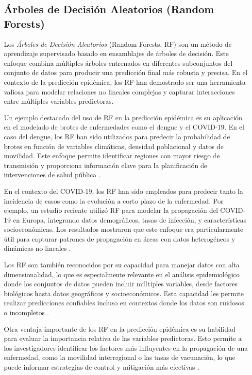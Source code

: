 \subsection{Árboles de Decisión Aleatorios (Random Forests)}\label{section:random-forests}

Los \textit{Árboles de Decisión Aleatorios} (Random Forests, RF) son un método de aprendizaje supervisado basado en ensamblajes de árboles de decisión. Este enfoque combina múltiples árboles entrenados en diferentes subconjuntos del conjunto de datos para producir una predicción final más robusta y precisa. En el contexto de la predicción epidémica, los RF han demostrado ser una herramienta valiosa para modelar relaciones no lineales complejas y capturar interacciones entre múltiples variables predictoras.

Un ejemplo destacado del uso de RF en la predicción epidémica es su aplicación en el modelado de brotes de enfermedades como el dengue y el COVID-19. En el caso del dengue, los RF han sido utilizados para predecir la probabilidad de brotes en función de variables climáticas, densidad poblacional y datos de movilidad. Este enfoque permite identificar regiones con mayor riesgo de transmisión y proporciona información clave para la planificación de intervenciones de salud pública \cite{Santangelo2023, Nguyen2023}.

En el contexto del COVID-19, los RF han sido empleados para predecir tanto la incidencia de casos como la evolución a corto plazo de la enfermedad. Por ejemplo, un estudio reciente utilizó RF para modelar la propagación del COVID-19 en Europa, integrando datos demográficos, tasas de infección, y características socioeconómicas. Los resultados mostraron que este enfoque era particularmente útil para capturar patrones de propagación en áreas con datos heterogéneos y dinámicas no lineales \cite{MachineLearningReview2023}.

Los RF son también reconocidos por su capacidad para manejar datos con alta dimensionalidad, lo que es especialmente relevante en el análisis epidemiológico donde los conjuntos de datos pueden incluir múltiples variables, desde factores biológicos hasta datos geográficos y socioeconómicos. Esta capacidad les permite realizar predicciones confiables incluso en contextos donde los datos son ruidosos o incompletos \cite{Baccega2024}.

Otra ventaja importante de los RF en la predicción epidémica es su habilidad para evaluar la importancia relativa de las variables predictoras. Esto permite a los investigadores identificar los factores más influyentes en la propagación de una enfermedad, como la movilidad interregional o las tasas de vacunación, lo que puede informar estrategias de control y mitigación más efectivas \cite{Rizzo2020}.

